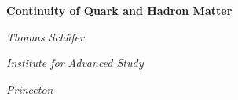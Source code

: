 

\textheight 28cm
\textwidth 16cm
\hoffset -1cm
\voffset -2cm


\pagestyle{plain}


\centerline{\Large\bf Continuity of Quark and Hadron Matter}
\vspace*{0.8cm}
\centerline{\large\it Thomas Sch\"afer}
\vspace*{0.3cm}
\centerline{\large\it Institute for Advanced Study}
\vspace*{0.3cm}
\centerline{\large\it Princeton}


\begin{figure}[h]
\begin{center}
\begin{minipage}{70mm}
\epsfxsize=14cm
\end{minipage}
\end{center}
\end{figure}






